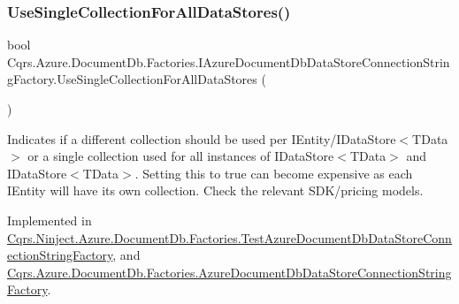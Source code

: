 \mbox{\label{interfaceCqrs_1_1Azure_1_1DocumentDb_1_1Factories_1_1IAzureDocumentDbDataStoreConnectionStringFactory_ae500b0191fee202806701e4f856c43dd_ae500b0191fee202806701e4f856c43dd}} 
\subsubsection{\texorpdfstring{Use\+Single\+Collection\+For\+All\+Data\+Stores()}{UseSingleCollectionForAllDataStores()}}
{\footnotesize\ttfamily bool Cqrs.\+Azure.\+Document\+Db.\+Factories.\+I\+Azure\+Document\+Db\+Data\+Store\+Connection\+String\+Factory.\+Use\+Single\+Collection\+For\+All\+Data\+Stores (\begin{DoxyParamCaption}{ }\end{DoxyParamCaption})}



Indicates if a different collection should be used per I\+Entity/I\+Data\+Store$<$\+T\+Data$>$ or a single collection used for all instances of I\+Data\+Store$<$\+T\+Data$>$ and I\+Data\+Store$<$\+T\+Data$>$. Setting this to true can become expensive as each I\+Entity will have it\textquotesingle{}s own collection. Check the relevant S\+D\+K/pricing models. 



Implemented in \hyperlink{classCqrs_1_1Ninject_1_1Azure_1_1DocumentDb_1_1Factories_1_1TestAzureDocumentDbDataStoreConnectionStringFactory_aeac8ecfdbb2d1d7f18105f2e535c51fe_aeac8ecfdbb2d1d7f18105f2e535c51fe}{Cqrs.\+Ninject.\+Azure.\+Document\+Db.\+Factories.\+Test\+Azure\+Document\+Db\+Data\+Store\+Connection\+String\+Factory}, and \hyperlink{classCqrs_1_1Azure_1_1DocumentDb_1_1Factories_1_1AzureDocumentDbDataStoreConnectionStringFactory_aa7b4b3eca609a815358af227b0f53909_aa7b4b3eca609a815358af227b0f53909}{Cqrs.\+Azure.\+Document\+Db.\+Factories.\+Azure\+Document\+Db\+Data\+Store\+Connection\+String\+Factory}.

